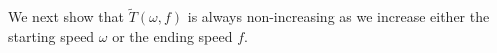 We next show that $\widetilde{T}(\omega, f)$ is always non-increasing as we increase either the starting speed $\omega$ or the ending speed $f$.

